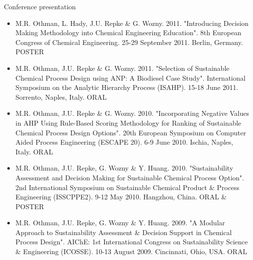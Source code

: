 \noindent
Conference presentation 
\begin{itemize}
\item M.R. Othman, L. Hady, J.U. Repke \& G. Wozny. 2011. "Introducing Decision Making Methodology into Chemical Engineering Education". 8th European Congress of Chemical Engineering. 25-29 September 2011. Berlin, Germany. POSTER

\item M.R. Othman, J.U. Repke \& G. Wozny. 2011. "Selection of Sustainable Chemical Process Design using ANP: A Biodiesel Case Study". International Symposium on the Analytic Hierarchy Process (ISAHP). 15-18 June 2011. Sorrento, Naples, Italy. ORAL

\item M.R. Othman, J.U. Repke \& G. Wozny. 2010. "Incorporating Negative Values in AHP Using Rule-Based Scoring Methodology for Ranking of Sustainable Chemical Process Design Options". 20th European Symposium on Computer Aided Process Engineering (ESCAPE 20). 6-9 June 2010. Ischia, Naples, Italy. ORAL

\item M.R. Othman, J.U. Repke, G. Wozny \& Y. Huang. 2010. "Sustainability Assessment and Decision Making for Sustainable Chemical Process Option". 2nd International Symposium on Sustainable Chemical Product \& Process Engineering (ISSCPPE2). 9-12 May 2010. Hangzhou, China. ORAL \& POSTER

\item M.R. Othman, J.U. Repke, G. Wozny \& Y. Huang. 2009. "A Modular Approach to Sustainability Assessment \& Decision Support in Chemical Process Design". AIChE: 1st International Congress on Sustainability Science \& Engineering (ICOSSE). 10-13 August 2009. Cincinnati, Ohio, USA. ORAL
\end{itemize}

